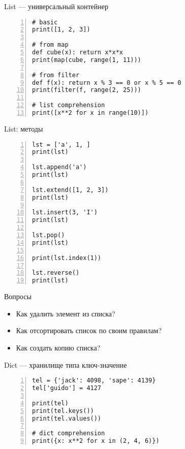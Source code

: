 \documentclass[hyperref={pdftex,unicode}]{beamer}
\begin{document}
\begin{frame}[fragile]{List --- универсальный контейнер}
  \begin{lstlisting}[basicstyle=\footnotesize\ttfamily,numbers=left]
# basic
print([1, 2, 3])

# from map
def cube(x): return x*x*x
print(map(cube, range(1, 11)))

# from filter
def f(x): return x % 3 == 0 or x % 5 == 0
print(filter(f, range(2, 25)))

# list comprehension
print([x**2 for x in range(10)])
\end{lstlisting}
\end{frame}

\begin{frame}[fragile]{List: методы}
  \begin{lstlisting}[basicstyle=\footnotesize\ttfamily,numbers=left]
lst = ['a', 1, ]
print(lst)

lst.append('a')
print(lst)

lst.extend([1, 2, 3])
print(lst)

lst.insert(3, 'I')
print(lst)

lst.pop()
print(lst)

print(lst.index(1))

lst.reverse()
print(lst)
  \end{lstlisting}
\end{frame}

\begin{frame}{Вопросы}
  \begin{itemize}
  \item Как удалить элемент из списка?
  \item Как отсортировать список по своим правилам?
  \item Как создать копию списка?
  \end{itemize}
\end{frame}

\begin{frame}[fragile]{Dict --- хранилище типа ключ-значение}
  \begin{lstlisting}[basicstyle=\footnotesize\ttfamily,numbers=left]
tel = {'jack': 4098, 'sape': 4139}
tel['guido'] = 4127

print(tel)
print(tel.keys())
print(tel.values())

# dict comprehension
print({x: x**2 for x in (2, 4, 6)})
  \end{lstlisting}
\end{frame}
\end{document}
